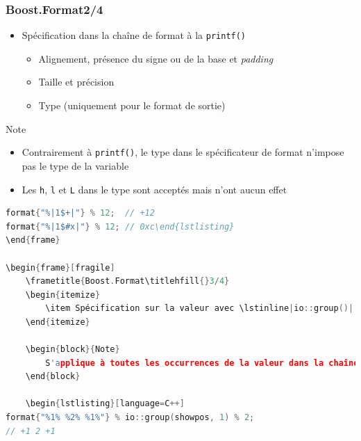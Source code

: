 \documentclass[C++.tex]{subfiles}
\begin{document}
\begin{frame}[fragile]
	\frametitle{Boost.Format\titlehfill{}2/4}
	\begin{itemize}
		\item Spécification dans la chaîne de format à la \lstinline|printf()|
		\begin{itemize}
			\item Alignement, présence du signe ou de la base et \textit{padding}
			\item Taille et précision
			\item Type (uniquement pour le format de sortie)
		\end{itemize}
	\end{itemize}

	\begin{block}{Note}
		\begin{itemize}
			\item Contrairement à \lstinline|printf()|, le type dans le spécificateur de format n'impose pas le type de la variable
			\item Les \lstinline|h|, \lstinline|l| et \lstinline|L| dans le type sont acceptés mais n'ont aucun effet
		\end{itemize}
	\end{block}

	\begin{lstlisting}[language=C++]
format{"%|1$+|"} % 12;  // +12
format{"%|1$#x|"} % 12;	// 0xc\end{lstlisting}
\end{frame}

\begin{frame}[fragile]
	\frametitle{Boost.Format\titlehfill{}3/4}
	\begin{itemize}
		\item Spécification sur la valeur avec \lstinline|io::group()|
	\end{itemize}

	\begin{block}{Note}
		S'applique à toutes les occurrences de la valeur dans la chaîne
	\end{block}

	\begin{lstlisting}[language=C++]
format{"%1% %2% %1%"} % io::group(showpos, 1) % 2; 
// +1 2 +1\end{lstlisting}
\end{frame}
\end{document}
